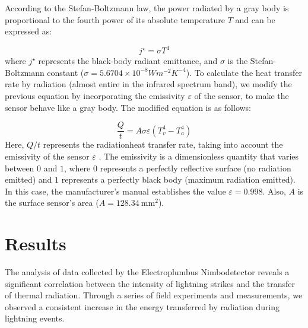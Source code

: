 \documentclass[english]{cenarticle}
\begin{document}
According to the Stefan-Boltzmann law, the power radiated by a gray body is proportional to the fourth power of its absolute temperature $T$ and can be expressed as:

\begin{equation}\label{StefanBoltzmannLaw}
  j^{\star}=\sigma T^{4}
\end{equation}
%
\noindent where $j^{\star}$ represents the black-body radiant emittance, and $\sigma$ is the Stefan-Boltzmann constant ($\sigma=5.6704\times10^{-8} Wm^{-2}K^{-4}$).
%
To calculate the heat transfer rate by radiation (almost entire in the infrared spectrum band), we modify the previous equation by incorporating the emissivity $\varepsilon$ of the sensor, to make the sensor behave like a gray body. The modified equation is as follows:

\begin{equation}
  \frac{Q}{t}=A\sigma\varepsilon (T_{v}^{4} - T_{a}^{4})
\end{equation}
%
Here, $Q \slash t$ represents the radiationheat transfer rate, taking into account the emissivity of the sensor $\varepsilon$ . The emissivity is a dimensionless quantity that varies between $0$ and $1$, where $0$ represents a perfectly reflective surface (no radiation emitted) and $1$ represents a perfectly black body (maximum radiation emitted). In this case, the manufacturer's manual establishes the value $\varepsilon = 0.998$. Also, $A$ is the surface sensor's area ($A=\SI{128.34}{\milli\meter^2}$).

\section{Results}

The analysis of data collected by the Electroplumbus Nimbodetector reveals a significant correlation between the intensity of lightning strikes and the transfer of thermal radiation. Through a series of field experiments and measurements, we observed a consistent increase in the energy transferred by radiation during lightning events.


 
\end{document}
